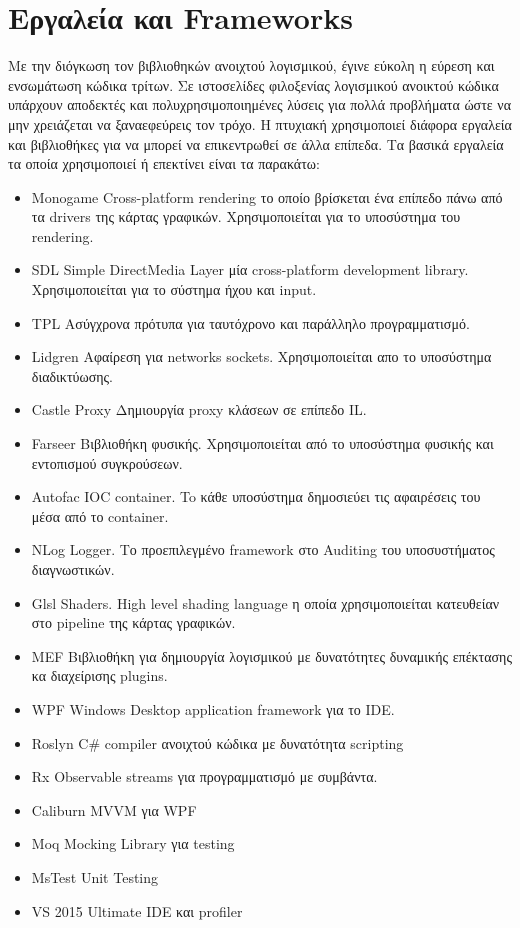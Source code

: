 \section{Εργαλεία και Frameworks}
Με την διόγκωση τον βιβλιοθηκών ανοιχτού λογισμικού, έγινε εύκολη η εύρεση και ενσωμάτωση κώδικα τρίτων. Σε ιστοσελίδες φιλοξενίας λογισμικού ανοικτού κώδικα υπάρχουν αποδεκτές και πολυχρησιμοποιημένες λύσεις για πολλά προβλήματα ώστε να μην χρειάζεται να ξαναεφεύρεις τον τρόχο. Η πτυχιακή χρησιμοποιεί διάφορα εργαλεία και βιβλιοθήκες για να μπορεί να επικεντρωθεί σε άλλα επίπεδα. Τα βασικά εργαλεία τα οποία χρησιμοποιεί ή επεκτίνει είναι τα παρακάτω:
\begin{itemize}
	\item{Monogame} Cross-platform rendering το οποίο βρίσκεται ένα επίπεδο πάνω από τα drivers της κάρτας γραφικών. Χρησιμοποιείται για το υποσύστημα του rendering.
	\item{SDL} Simple DirectMedia Layer μία cross-platform development library. Χρησιμοποιείται για το σύστημα ήχου και input.
	\item{TPL} Ασύγχρονα πρότυπα για ταυτόχρονο και παράλληλο προγραμματισμό.
	\item{Lidgren} Αφαίρεση για networks sockets. Χρησιμοποιείται απο το υποσύστημα διαδικτύωσης.
	\item{Castle Proxy} Δημιουργία proxy κλάσεων σε επίπεδο IL.
	\item{Farseer} Βιβλιοθήκη φυσικής. Χρησιμοποιείται από το υποσύστημα φυσικής και εντοπισμού συγκρούσεων.
	\item{Autofac} IOC container. To κάθε υποσύστημα δημοσιεύει τις αφαιρέσεις του μέσα από το container.
	\item{NLog} Logger. Το προεπιλεγμένο framework στο Auditing του υποσυστήματος διαγνωστικών.
	\item{Glsl} Shaders. High level shading language η οποία χρησιμοποιείται κατευθείαν στο pipeline της κάρτας γραφικών.
	\item{MEF} Βιβλιοθήκη για δημιουργία λογισμικού με δυνατότητες δυναμικής επέκτασης κα διαχείρισης plugins.
	\item{WPF} Windows Desktop application framework για το IDE.
	\item{Roslyn} C\# compiler ανοιχτού κώδικα με δυνατότητα scripting
	\item{Rx} Observable streams για προγραμματισμό με συμβάντα.
	\item{Caliburn} MVVM για WPF
	\item{Moq} Mocking Library για testing
	\item{MsTest} Unit Testing 
	\item{VS 2015 Ultimate} IDE και profiler
\end{itemize}

